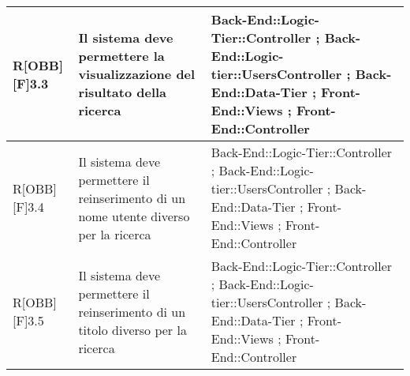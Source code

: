 \begin{table}[h]
\begin{tabular}{|p{}|p{}|p{}|}
			R[OBB][F]3.3 & Il sistema deve permettere la visualizzazione del risultato della ricerca & Back-End::Logic-Tier::Controller ; Back-End::Logic-tier::UsersController ; Back-End::Data-Tier ; Front-End::Views ; Front-End::Controller \\ \midrule
			R[OBB][F]3.4 & Il sistema deve permettere il reinserimento di un nome utente diverso per la ricerca & Back-End::Logic-Tier::Controller ; Back-End::Logic-tier::UsersController ; Back-End::Data-Tier ; Front-End::Views ; Front-End::Controller \\ \midrule
			R[OBB][F]3.5 & Il sistema deve permettere il reinserimento di un titolo diverso per la ricerca & Back-End::Logic-Tier::Controller ; Back-End::Logic-tier::UsersController ; Back-End::Data-Tier ; Front-End::Views ; Front-End::Controller \\ \midrule

		\end{tabular}
	\end{table}
	\newpage
	
